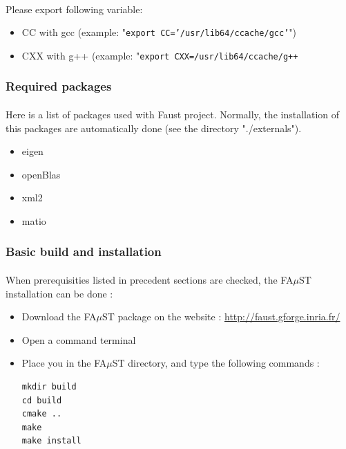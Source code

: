 \paragraph{}Please export following variable:
\begin{itemize}
\item CC with gcc (example: "\texttt{export CC='/usr/lib64/ccache/gcc'}") 
\item CXX with g++ (example: "\texttt{export CXX=/usr/lib64/ccache/g++}
\end{itemize}

\subsubsection{Required packages}\label{sec:RequiredPackages}

\paragraph{}Here is a list of packages used with Faust project. Normally, the installation of this packages are automatically done (see the directory "./externals").
\begin{itemize}
\item eigen
\item openBlas
\item xml2
\item matio
\end{itemize}

\subsubsection{Basic build and installation}\label{sec:UnixBuildInstall}
\paragraph{}When prerequisities listed in precedent sections are checked, the FA$\mu$ST installation can be done : 

\begin{itemize}
\item Download the FA$\mu$ST package on the website :  \url{http://faust.gforge.inria.fr/}
\item Open a command terminal
\item Place you in the FA$\mu$ST directory, and type the following commands : 
\begin{lstlisting}
mkdir build
cd build
cmake ..
make
make install
\end{lstlisting}
\end{itemize}

